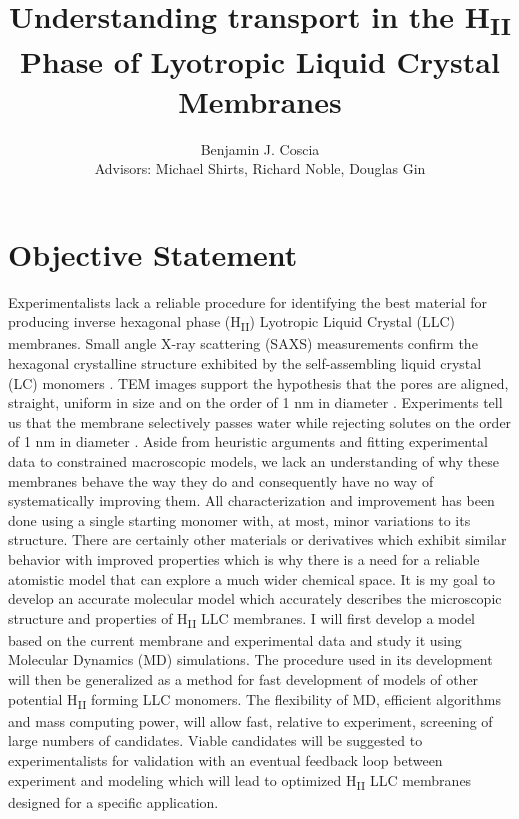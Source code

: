 \documentclass[12pt]{article}
\title{Understanding transport in the H\textsubscript{II} Phase of Lyotropic Liquid Crystal Membranes}
\author{Benjamin J. Coscia\\
	Advisors: Michael Shirts, Richard Noble, Douglas Gin}
\begin{document}

\maketitle
\section{Objective Statement}

Experimentalists lack a reliable procedure for identifying the best material for producing inverse hexagonal phase (H\textsubscript{II}) Lyotropic Liquid Crystal (LLC) membranes. Small angle X-ray scattering (SAXS) measurements confirm the hexagonal crystalline structure exhibited by the self-assembling liquid crystal (LC) monomers \cite{smith_ordered_1997}. TEM images support the hypothesis that the pores are aligned, straight, uniform in size and on the order of 1 nm in diameter \cite{feng_scalable_2014, feng_thin_2016}. Experiments tell us that the membrane selectively passes water while rejecting solutes on the order of 1 nm in diameter \cite{zhou_supported_2005}. Aside from heuristic arguments and fitting experimental data to constrained macroscopic models, we lack an understanding of why these membranes behave the way they do and consequently have no way of systematically improving them. All characterization and improvement has been done using a single starting monomer with, at most, minor variations to its structure. There are certainly other materials or derivatives which exhibit similar behavior with improved properties which is why there is a need for a reliable atomistic model that can explore a much wider chemical space. It is my goal to develop an accurate molecular model which accurately describes the microscopic structure and properties of H\textsubscript{II} LLC membranes. I will first develop a model based on the current membrane and experimental data and study it using Molecular Dynamics (MD) simulations. The procedure used in its development will then be generalized as a method for fast development of models of other potential H\textsubscript{II} forming LLC monomers. The flexibility of MD, efficient algorithms and mass computing power, will allow fast, relative to experiment, screening of large numbers of candidates. Viable candidates will be suggested to experimentalists for validation with an eventual feedback loop between experiment and modeling which will lead to optimized H\textsubscript{II} LLC membranes designed for a specific application.
\end{document}
